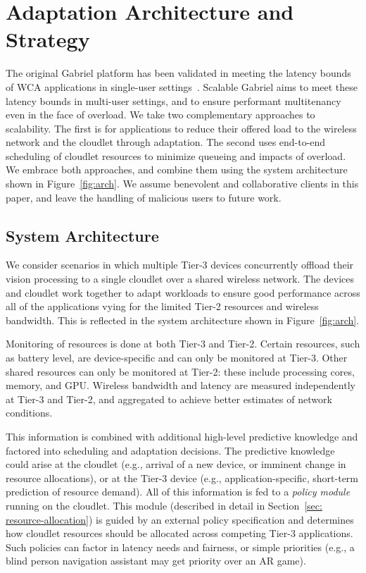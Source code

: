 \section{Adaptation Architecture and Strategy}

The original Gabriel platform has been validated in meeting the
latency bounds of WCA applications in single-user
settings~\cite{chen2017empirical}.  Scalable Gabriel aims to meet these latency
bounds in multi-user settings, and to ensure performant multitenancy
even in the face of overload.  We take two complementary approaches to
scalability.  The first is for applications to reduce their offered
load to the wireless network and the cloudlet through adaptation.  The
second uses end-to-end scheduling of cloudlet resources to minimize
queueing and impacts of overload.  We embrace both approaches, and
combine them using the system architecture shown in
Figure~\ref{fig:arch}.  We assume benevolent and collaborative clients
in this paper, and leave the handling of malicious users to future work.

\subsection{System Architecture}

We consider scenarios in which multiple Tier-3 devices concurrently
offload their vision processing to a single cloudlet over a shared
wireless network.  The devices and cloudlet work together to adapt
workloads to ensure good performance across all of the applications
vying for the limited Tier-2 resources and wireless bandwidth.  This
is reflected in the system architecture shown in
Figure~\ref{fig:arch}.

Monitoring of resources is done at both Tier-3 and Tier-2.  Certain
resources, such as battery level, are device-specific and can only be
monitored at Tier-3.  Other shared resources can only be monitored at
Tier-2: these include processing cores, memory, and GPU.  Wireless
bandwidth and latency are measured independently at Tier-3 and Tier-2,
and aggregated to achieve better estimates of network conditions.

This information is combined with additional high-level predictive
knowledge and factored into scheduling and adaptation decisions.  The
predictive knowledge could arise at the cloudlet (e.g., arrival of a
new device, or imminent change in resource allocations), or at the
Tier-3 device (e.g., application-specific, short-term prediction of
resource demand).  All of this information is fed to a {\em policy
  module} running on the cloudlet.  This module (described in detail
in Section~\ref{sec: resource-allocation}) is guided by an external
policy specification and determines how cloudlet resources should be
allocated across competing Tier-3 applications.  Such policies can
factor in latency needs and fairness, or simple priorities (e.g., a
blind person navigation assistant may get priority over an AR game).


